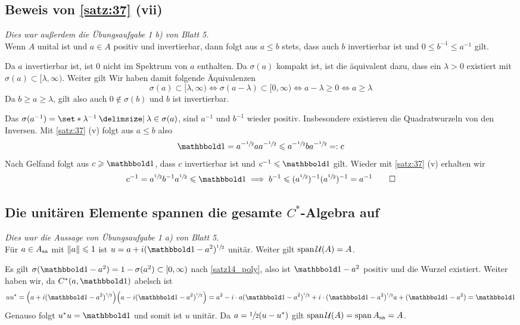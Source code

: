 \subsection{Beweis von \autoref{satz:37} (vii)} %
\label{sub:beweis_37_vii}
\emph{Dies war außerdem die Übungsaufgabe 1 b) von Blatt 5.} \smallskip\\
Wenn $A$ unital ist und $a \in A$ positiv und invertierbar, dann folgt aus $a \le b$ stets, dass auch $b$ invertierbar ist und $0 \le b^{-1} \le a^{-1}$ gilt.
\begin{beweis}
	Da $a$ invertierbar ist, ist $0$ nicht im Spektrum von $a$ enthalten.
	Da $\sigma(a)$ kompakt ist, ist die äquivalent dazu, dass ein $\lambda>0$ existiert mit $\sigma(a) \subset [\lambda,\infty)$.
	Weiter gilt
	Wir haben damit folgende Äquivalenzen
	\[
		\sigma(a) \subset [\lambda,\infty) \iff \sigma(a-\lambda) \subset [0,\infty) \iff a- \lambda\ge 0 \iff a \ge \lambda
	\]
	Da $b\ge a \ge \lambda$, gilt also auch $0 \notin \sigma(b)$ und $b$ ist invertierbar.
	
	Das $\sigma(a^{-1}) = \set*{\lambda^{-1} \given \lambda \in  \sigma(a)}$, sind $a^{-1}$ und $b ^{-1}$ wieder positiv.
	Insbesondere existieren die Quadratwurzeln von den Inversen. 
	Mit \autoref{satz:37} (v) folgt aus $a \le b$ also 
	\[
		\ind=a^{-\sfrac{1}{2}} a a^{- \sfrac{1}{2}} \le a^{-\sfrac{1}{2}} b a^{-\sfrac{1}{2}} =: c
	\]
	Nach Gelfand folgt aus $c \ge \ind$, dass $c$ invertierbar ist und $c^{-1} \le \ind$ gilt. Wieder mit \autoref{satz:37} (v) erhalten wir
	\[
		c^{-1} = a^{\sfrac{1}{2}}b^{-1}a^{\sfrac{1}{2}} \le \ind \implies b^{-1} \le \enbrace{a^{\sfrac{1}{2}}}^{-1} \enbrace{a^{\sfrac{1}{2}}}^{-1} =a^{-1} \qedhere
	\]
\end{beweis}

\subsection{Die unitären Elemente spannen die gesamte $C^*$-Algebra auf} %
\label{sub:span_unitaer}
\emph{Dies war die Aussage von Übungsaufgabe 1 a) von Blatt 5.}\smallskip\\
Für $a \in A_\sa$ mit $\norm*{a} \le 1$ ist $u= a + i (\ind-a^2)^{\sfrac{1}{2}}$ unitär.
Weiter gilt $\Span \mathcal{U}(A)=A$.
\begin{beweis}
	Es gilt $\sigma(\ind -a^2) = 1 - \sigma(a^2) \subset [0,\infty)$ nach \autoref{satz14_poly}, also ist $\ind -a^2$ positiv und die Wurzel existiert.
	Weiter haben wir, da $C^*(a, \ind)$ abelsch ist
	\[
		uu^* = \enbrace*{a+ i (\ind-a^2)^{\sfrac{1}{2}}} \enbrace*{a- i (\ind -a^2)^{\sfrac{1}{2}}} = a^2 - i \cdot a(\ind-a^2)^{\sfrac{1}{2}} + i \cdot (\ind-a^2)^{\sfrac{1}{2}}a + (\ind-a^2)=\ind
	\]
	Genauso folgt $u^*u=\ind$ und somit ist $u$ unitär.
	Da $a= \sfrac{1}{2}(u-u^*)$ gilt $\Span\mathcal{U}(A)=\Span A_\sa=A$. 
\end{beweis}


